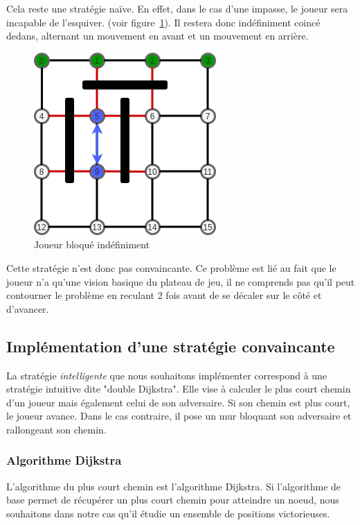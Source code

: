 \documentclass[a4paper]{article}
\begin{document}
Cela reste une stratégie naïve. En effet, dans le cas d'une impasse, le joueur sera incapable de l'esquiver. (voir figure~\ref{fig:rush2}). Il restera donc indéfiniment coincé dedans, alternant un mouvement en avant et un mouvement en arrière. \\

\begin{figure}[h!t]
    \centering
    \includegraphics[scale=0.65]{rush2.png}
    \caption{Joueur  bloqué indéfiniment}
    \label{fig:rush2}
\end{figure}

Cette stratégie n'est donc pas convaincante. Ce problème est lié au fait que le joueur n'a qu'une vision basique du plateau de jeu, il ne comprends pas qu'il peut contourner le problème en reculant 2 fois avant de se décaler sur le côté et d'avancer.

\subsection{Implémentation d'une stratégie convaincante}

La stratégie \textit{intelligente} que nous souhaitons implémenter correspond à une stratégie intuitive dite "double Dijkstra". Elle vise à calculer le plus court chemin d'un joueur mais également celui de son adversaire. Si son chemin est plus court, le joueur avance. Dans le cas contraire, il pose un mur bloquant son adversaire et rallongeant son chemin.

\subsubsection{Algorithme Dijkstra}
L'algorithme du plus court chemin est l'algorithme Dijkstra. Si l'algorithme de base permet de récupérer un plus court chemin pour atteindre un noeud, nous souhaitons dans notre cas qu'il étudie un ensemble de positions victorieuses. \\
\end{document}
